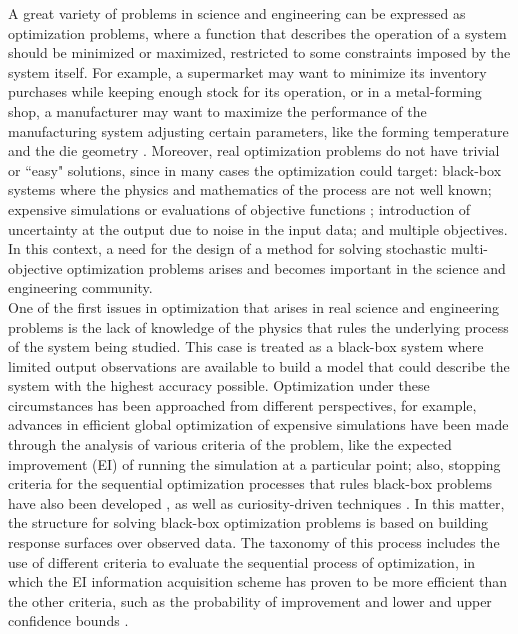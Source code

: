\documentclass{article}
\begin{document}
A great variety of problems in science and engineering can be expressed as optimization problems, where a function that describes the operation of a system should be minimized or maximized, restricted to some constraints imposed by the system itself. For example, a supermarket may want to minimize its inventory purchases while keeping enough stock for its operation, or in a metal-forming shop, a manufacturer may want to maximize the performance of the manufacturing system adjusting certain parameters, like the forming temperature and the die geometry \cite{Huang2006}. Moreover, real optimization problems do not have trivial or ``easy" solutions, since in many cases the optimization could target: black-box systems where the physics and mathematics of the process are not well known; expensive simulations or evaluations of objective functions \cite{Jones1998}; introduction of uncertainty at the output due to noise in the input data; and multiple objectives. In this context, a need for the design of a method for solving stochastic multi-objective optimization problems arises and becomes important in the science and engineering community.\\

One of the first issues in optimization that arises in real science and engineering problems is the lack of knowledge of the physics that rules the underlying process of the system being studied. This case is treated as a black-box system where limited output observations are available to build a model that could describe the system with the highest accuracy possible. Optimization under these circumstances has been approached from different perspectives, for example, advances in efficient global optimization of expensive simulations have been made through the analysis of various criteria of the problem, like the expected improvement (EI) of running the simulation at a particular point; also, stopping criteria for the sequential optimization processes that rules black-box problems have also been developed \cite{Jones1998}, as well as curiosity-driven techniques \cite{Schaul2011}. In this matter, the structure for solving black-box optimization problems is based on building response surfaces over observed data. The taxonomy of this process includes the use of different criteria to evaluate the sequential process of optimization, in which the EI information acquisition scheme has proven to be more efficient than the other criteria, such as the probability of improvement and lower and upper confidence bounds \cite{Jones2001}.\\
\end{document}
